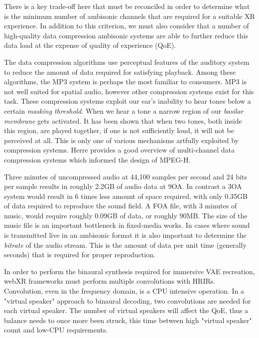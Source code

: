 There is a key trade-off here that must be reconciled in order to determine what is the minimum number of ambisonic channels that are required for a suitable XR experience. In addition to this criterion, we must also consider that a number of high-quality data compression ambisonic systems are able to further reduce this data load at the expense of quality of experience (QoE). 

The data compression algorithms use perceptual features of the auditory system to reduce the amount of data required for satisfying playback. Among these algorithms, the MP3 system is perhaps the most familiar to consumers. MP3 is not well suited for spatial audio, however other compression systems exist for this task. These compression systems exploit our ear's inability to hear tones below a certain \textit{masking threshold}. When we hear a tone a narrow region of our \textit{basilar membrane} gets activated. It has been shown that when two tones, both inside this region, are played together, if one is not sufficiently loud, it will not be perceived at all. This is only one of various mechanisms artfully exploited by compression systems. Herre \cite{herre2015mpeg} provides a good overview of multi-channel data compression systems which informed the design of MPEG-H. 

Three minutes of uncompressed audio at 44,100 samples per second and 24 bits per sample results in roughly 2.2GB of audio data at 9OA. In contrast a 3OA system would result in 6 times less amount of space required, with only 0.35GB of data required to reproduce the sound field. A FOA file, with 3 minutes of music, would require roughly 0.09GB of data, or roughly 90MB. The size of the music file is an important bottleneck in fixed-media works. In cases where sound is transmitted live in an ambisonic format it is also important to determine the \textit{bitrate} of the audio stream. This is the amount of data per unit time (generally seconds) that is required for proper reproduction. 

In order to perform the binaural synthesis required for immersive VAE recreation, webXR frameworks must perform multiple convolutions with HRIRs. Convolution, even in the frequency domain, is a CPU intensive operation. In a "virtual speaker" approach to binaural decoding, two convolutions are needed for each virtual speaker. The number of virtual speakers will affect the QoE, thus a balance needs to once more been struck, this time between high "virtual speaker" count and low-CPU requirements. 

